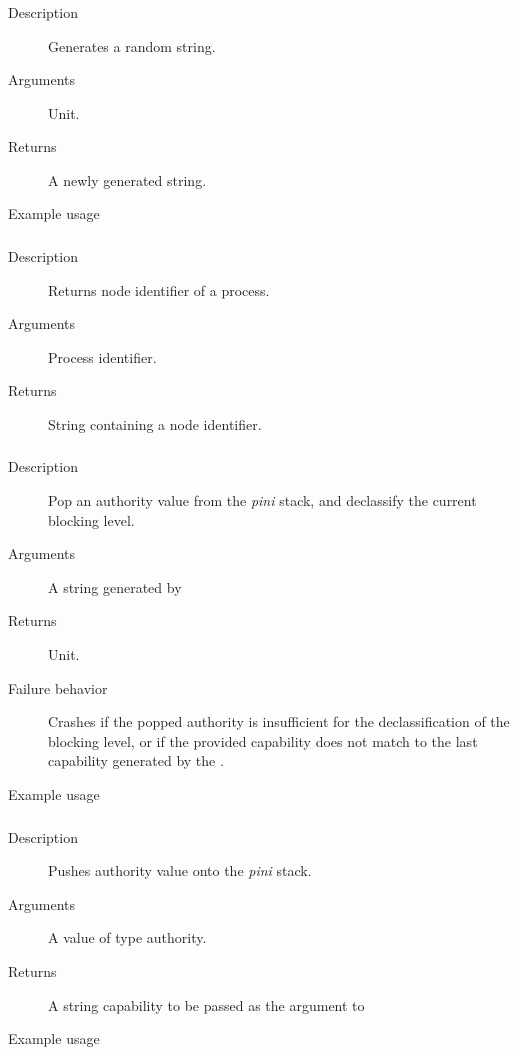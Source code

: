 \subsubsection{}
\begin{description}
    \item [Description] Generates a random string.
    \item [Arguments] Unit.
    \item [Returns] A newly generated string.
    \item [Example usage] 
\end{description}


\subsubsection{}
\begin{description}
    \item [Description] Returns node identifier of a process.
    \item [Arguments] Process identifier.
    \item [Returns] String containing a node identifier.
\end{description}




\subsubsection{}
\begin{description}
    \item [Description] Pop an authority value from the \emph{pini} stack, and declassify the current blocking level.
    \item [Arguments] A string generated by 
    \item [Returns] Unit.
    \item [Failure behavior] Crashes if the popped authority is insufficient for the declassification of the blocking level,
or if the provided capability does not match to the last capability generated by the .
    \item [Example usage] 
\end{description}

\subsubsection{}
\begin{description}
    \item [Description] Pushes authority value onto the \emph{pini} stack.
    \item [Arguments] A value of type authority.
    \item [Returns] A string capability to be passed as the argument to 
    \item [Example usage] 
\end{description}


